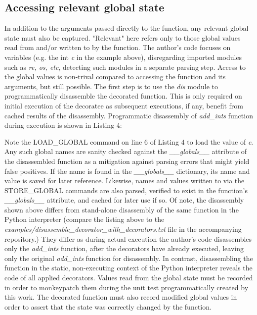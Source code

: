 %
\subsection{Accessing relevant global state}\label{sec:approach-internal-2}

In addition to the arguments passed directly to the function, any relevant 
global state must also be captured. "Relevant" here refers only to those 
global values read from and/or written to by the function.
The author's code focuses on variables (e.g. the int \textit{c} in the example above), 
disregarding imported modules such as \textit{re, os, etc}, detecting such
modules in a separate parsing step.
Access to the global values is non-trival compared to accessing the function 
and its arguments, but still possible.  The first step is to use the \textit{dis}
module to programmatically disassemble the decorated function.  This is only 
required on initial execution of the decoratee as subsequent executions, if any, 
benefit from cached results of the disassembly.
Programmatic disassembly of \textit{add\_ints} function during execution is shown
in Listing 4:



Note the LOAD\_GLOBAL command on line 6 of Listing 4 to load the value of 
\textit{c}.  Any such global names are sanity checked against the 
\textit{\_\_globals\_\_} attribute of the disassembled function as a 
mitigation against parsing errors that might yield false positives.
%
If the name is found in the \textit{\_\_globals\_\_} dictionary, its name and 
value is saved for later reference.  Likewise, names and values written to via 
the STORE\_GLOBAL commands are also parsed, verified to exist in the function's
 \textit{\_\_globals\_\_} attribute, and cached for later use if so.
%
Of note, the disassembly shown above differs from stand-alone disassembly of 
the same function in the Python interpreter (compare the listing above to the
\textit{examples/disassemble\_decorator\_with\_decorators.txt} file in the 
 accompanying repository.)
They differ as during actual execution the author's code
 disassembles only the \textit{add\_ints} function, after the decorators
  have already executed, leaving only the original  \textit{add\_ints}
  function for disassembly.
In contrast, disassembling the function in the static, non-executing context of
the Python interpreter reveals the code of all applied decorators.  
%
Values read from the global state must be recorded 
in order to monkeypatch them during the unit test programmatically 
created by this work.
%
The decorated function must also record modified global values in
order to assert that the state was correctly changed by the function.

